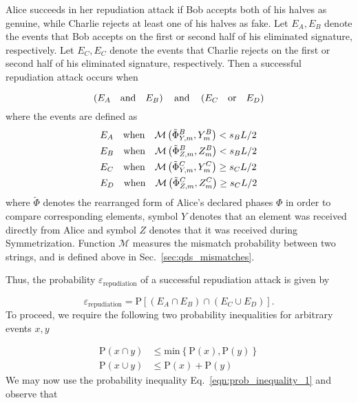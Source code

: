 
Alice succeeds in her repudiation attack if Bob accepts both of his halves as genuine, while Charlie rejects at least one of his halves as fake. Let $E_A, E_B$ denote the events that Bob accepts on the first or second half of his eliminated signature, respectively. Let $E_C, E_C$ denote the events that Charlie rejects on the first or second half of his eliminated signature, respectively. Then a successful repudiation attack occurs when

\begin{equation}
\left(E_A \qq{and} E_B \right) \qq{and} \left( E_C \qq{or} E_D\right) \notag
\end{equation}
where the events are defined as
\begin{align}\label{eqn:repudiation_events}
&E_A \qq{when} \mathcal{M}\left(\tilde{\Phi}_{Y, m}^B, Y_m^B\right) < s_B L/2  \notag \\
%
&E_B \qq{when} \mathcal{M}\left(\tilde{\Phi}_{Z, m}^B, Z_m ^B\right) < s_B L/2 \notag \\
%
&E_C \qq{when} \mathcal{M}\left(\tilde{\Phi}_{Y, m}^C, Y_m^C\right) \ge s_C L/2 \notag \\
%
&E_D \qq{when} \mathcal{M}\left(\tilde{\Phi}_{Z, m}^C, Z_m^C\right) \ge s_C L/2 
\end{align}
where $\tilde{\Phi}$ denotes the rearranged form of Alice's declared phases $\Phi$ in order to compare corresponding elements, symbol $Y$ denotes that an element was received directly from Alice and symbol $Z$ denotes that it was received during Symmetrization. Function $\mathcal{M}$ measures the mismatch probability between two strings, and is defined above in Sec.~\ref{sec:qds_mismatches}.

Thus, the probability $\varepsilon_{\text{repudiation}}$ of a successful repudiation attack is given by

\begin{equation}
\varepsilon_{\text{repudiation}} = \text{P}\left[\left(E_A \cap E_B\right) \cap \left(E_C \cup E_D\right)\right].
\end{equation}
To proceed, we require the following two probability inequalities for arbitrary events $x, y$

\begin{align}
\label{eqn:prob_inequality_1}
\text{P}\left(x \cap y\right) &\le \text{min}\left\{\text{P}\left(x\right), \text{P}\left(y\right)\right\} \\
\label{eqn:prob_inequality_2}
\text{P}\left(x \cup y\right) &\le \text{P}\left(x\right) + \text{P}\left(y\right)
\end{align}
\noindent We may now use the probability inequality Eq.~\ref{eqn:prob_inequality_1} and observe that 

